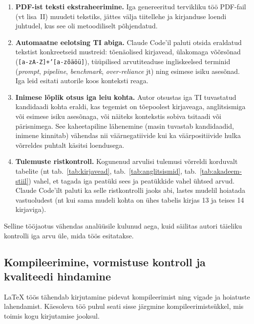 \begin{enumerate}
    \item \textbf{PDF-ist teksti ekstraheerimine.} Iga genereeritud tervikliku töö PDF-fail (vt lisa~II) muudeti tekstiks, jättes välja tiitellehe ja kirjanduse loendi juhtudel, kus see oli metoodiliselt põhjendatud.
    \item \textbf{Automaatne eelotsing TI abiga.} Claude Code'il paluti otsida eraldatud tekstist konkreetseid mustreid: tõenäolised kirjavead, ülakomaga võõrsõnad (\texttt{[a-zA-Z]+'[a-zõäöü]}), tüüpilised arvutiteaduse ingliskeelsed terminid (\textit{prompt}, \textit{pipeline}, \textit{benchmark}, \textit{over-reliance} jt) ning esimese isiku asesõnad. Iga leid esitati autorile koos konteksti reaga.
    \item \textbf{Inimese lõplik otsus iga leiu kohta.} Autor otsustas iga TI tuvastatud kandidaadi kohta eraldi, kas tegemist on tõepoolest kirjaveaga, anglitsismiga või esimese isiku asesõnaga, või näiteks kontekstis sobiva tsitaadi või pärisnimega. See kaheetapiline lähenemine (masin tuvastab kandidaadid, inimene kinnitab) vähendas nii väärnegatiivide kui ka väärpositiivide hulka võrreldes puhtalt käsitsi loendusega.
    \item \textbf{Tulemuste ristkontroll.} Kogunenud arvulisi tulemusi võrreldi korduvalt tabelite (nt tab.~\ref{tab:kirjavead}, tab.~\ref{tab:anglitsismid}, tab.~\ref{tab:akadeem-stiil}) vahel, et tagada iga peatüki sees ja peatükkide vahel ühtsed arvud. Claude Code'ilt paluti ka selle ristkontrolli jaoks abi, lastes mudelil hoiatada vastuoludest (nt kui sama mudeli kohta on ühes tabelis kirjas 13 ja teises 14 kirjaviga).
\end{enumerate}

Selline tööjaotus vähendas analüüsile kulunud aega, kuid säilitas autori täieliku kontrolli iga arvu üle, mida töös esitatakse.

\subsection{Kompileerimine, vormistuse kontroll ja kvaliteedi hindamine} \label{subsec:kompileerimine}

\LaTeX{} töös tähendab kirjutamine pidevat kompileerimist ning vigade ja hoiatuste lahendamist. Käesoleva töö puhul seati sisse järgmine kompileerimistsükkel, mis toimis kogu kirjutamise jooksul.

